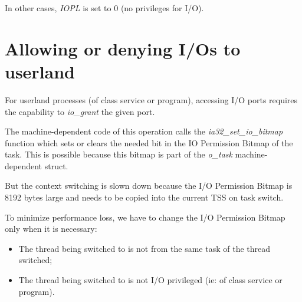 In other cases, \textit{IOPL} is set to 0 (no privileges for I/O).

%
%

\section{Allowing or denying I/Os to userland}

For userland processes (of class service or program), accessing I/O
ports requires the capability to \textit{io\_grant} the given port.

The machine-dependent code of this operation calls the
\textit{ia32\_set\_io\_bitmap} function which sets or clears the
needed bit in the IO Permission Bitmap of the task. This is possible
because this bitmap is part of the \textit{o\_task} machine-dependent
struct.

But the context switching is slown down because the I/O Permission
Bitmap is 8192 bytes large and needs to be copied into the current TSS
on task switch.

To minimize performance loss, we have to change the I/O Permission
Bitmap only when it is necessary:
\begin{itemize}
\item
  The thread being switched to is not from the same task of the thread
  switched;
\item
  The thread being switched to is not I/O privileged (ie: of class
  service or program).
\end{itemize}
